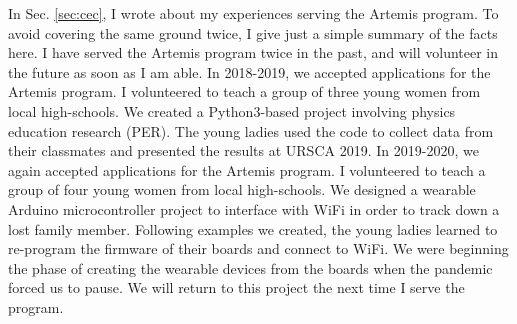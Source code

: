 \documentclass[../../../main.tex]{subfiles}
\begin{document}
\label{sec:cec_artemis}

In Sec. \ref{sec:cec}, I wrote about my experiences serving the Artemis program.  To avoid covering the same ground twice, I give just a simple summary of the facts here.  I have served the Artemis program twice in the past, and will volunteer in the future as soon as I am able.  In 2018-2019, we accepted applications for the Artemis program.  I volunteered to teach a group of three young women from local high-schools.  We created a Python3-based project involving physics education research (PER).  The young ladies used the code to collect data from their classmates and presented the results at URSCA 2019.  In 2019-2020, we again accepted applications for the Artemis program.  I volunteered to teach a group of four young women from local high-schools.  We designed a wearable Arduino microcontroller project to interface with WiFi in order to track down a lost family member.  Following examples we created, the young ladies learned to re-program the firmware of their boards and connect to WiFi.  We were beginning the phase of creating the wearable devices from the boards when the pandemic forced us to pause.  We will return to this project the next time I serve the program.
\end{document}
